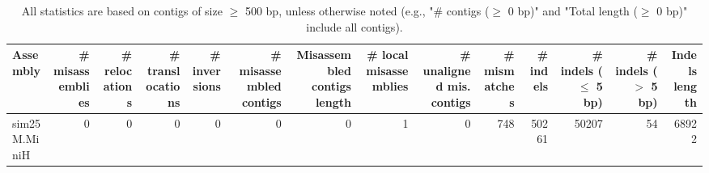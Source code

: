 \documentclass[12pt,a4paper]{article}
\begin{document}
\begin{table}[ht]
\begin{center}
\caption{All statistics are based on contigs of size $\geq$ 500 bp, unless otherwise noted (e.g., "\# contigs ($\geq$ 0 bp)" and "Total length ($\geq$ 0 bp)" include all contigs).}
\begin{tabular}{|l*{13}{|r}|}
\hline
Assembly & \# misassemblies &     \# relocations &     \# translocations &     \# inversions & \# misassembled contigs & Misassembled contigs length & \# local misassemblies & \# unaligned mis. contigs & \# mismatches & \# indels &     \# indels ($\leq$ 5 bp) &     \# indels ($>$ 5 bp) & Indels length \\ \hline
sim25M.MiniH & 0 & 0 & 0 & 0 & 0 & 0 & 1 & 0 & 748 & 50261 & 50207 & 54 & 68922 \\ \hline
\end{tabular}
\end{center}
\end{table}
\end{document}
